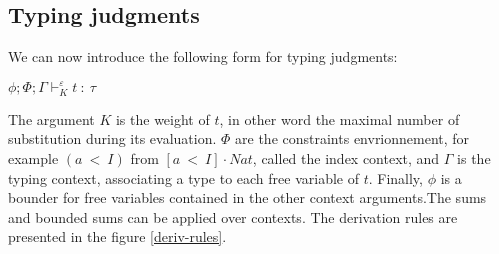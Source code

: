 \documentclass[a4paper,12pt]{article}
\begin{document}
\subsection{Typing judgments}

We can now introduce the following form for typing judgments:

\begin{center}
  $\phi; \Phi; \Gamma \vdash_{K}^{\varepsilon} t~:~\tau$
\end{center}

The argument $K$ is the weight of $t$, in other word the maximal number of
substitution during its evaluation. $\Phi$ are the constraints envrionnement,
for example $(a~<~I)$ from $[a~<~I] \cdot Nat$, called the index context, and
$\Gamma$ is the typing context, associating a type to each free variable of $t$.
Finally, $\phi$ is a bounder for free variables contained in the other context
arguments.The sums and bounded sums can be applied over contexts. The derivation
rules are presented in the figure \ref{deriv-rules}.
\end{document}
